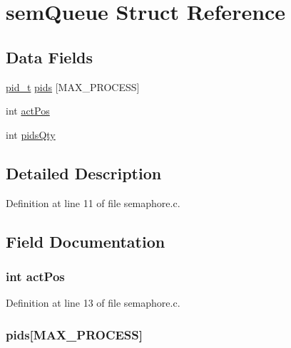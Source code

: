 \hypertarget{structsem_queue}{
\section{semQueue Struct Reference}
\label{structsem_queue}
}
\subsection*{Data Fields}
\begin{DoxyCompactItemize}
\item 
\hyperlink{types_8h_ab612a3a4eb0e2ced1e55ecff76260458}{pid\_\-t} \hyperlink{structsem_queue_a851c68a9d8a28e48ed3d9bfc73d9beda}{pids} \mbox{[}MAX\_\-PROCESS\mbox{]}
\item 
int \hyperlink{structsem_queue_a3742955749f912de093848fe1385659d}{actPos}
\item 
int \hyperlink{structsem_queue_a9d456afc79beb2848acfed9c69887f8a}{pidsQty}
\end{DoxyCompactItemize}


\subsection{Detailed Description}


Definition at line 11 of file semaphore.c.



\subsection{Field Documentation}
\hypertarget{structsem_queue_a3742955749f912de093848fe1385659d}{
\subsubsection[{actPos}]{\setlength{\rightskip}{0pt plus 5cm}int {\bf actPos}}}
\label{structsem_queue_a3742955749f912de093848fe1385659d}


Definition at line 13 of file semaphore.c.

\hypertarget{structsem_queue_a851c68a9d8a28e48ed3d9bfc73d9beda}{
\subsubsection[{pids}]{ {\bf pids}\mbox{[}MAX\_\-PROCESS\mbox{]}}}
\label{structsem_queue_a851c68a9d8a28e48ed3d9bfc73d9beda}


